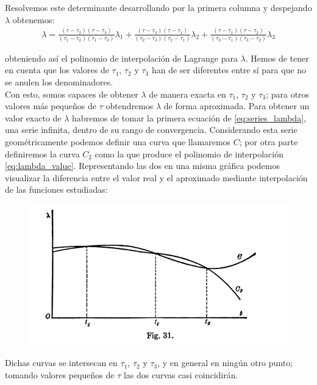\documentclass[11pt]{article}
\begin{document}
Resolvemos este determinante desarrollando por la primera columna y despejando $\lambda$ obtenemos:
\begin{align}
\lambda=
\frac{(\tau-\tau_2)(\tau-\tau_3)}{(\tau_1-\tau_2)(\tau_1-\tau_3)}\lambda_1
+\frac{(\tau-\tau_3)(\tau-\tau_1)}{(\tau_2-\tau_3)(\tau_2-\tau_1)}\lambda_2
+\frac{(\tau-\tau_1)(\tau-\tau_2)}{(\tau_3-\tau_1)(\tau_3-\tau_2)}\lambda_3
\label{eq:lambda_value}
\end{align}

\noindent obteniendo así el polinomio de interpolación de Lagrange para $\lambda$. Hemos de tener en cuenta que los valores de $\tau_1$, $\tau_2$ y $\tau_3$ han de ser diferentes entre sí para que no se anulen los denominadores.\\

Con esto, somos capaces de obtener $\lambda$ de manera exacta en $\tau_1$, $\tau_2$ y $\tau_3$; para otros valores más pequeños de $\tau$ obtendremos $\lambda$ de forma aproximada. Para obtener un valor exacto de $\lambda$ habremos de tomar la primera ecuación de \eqref{eq:series_lambda}, una serie infinita, dentro de su rango de convergencia. Considerando esta serie geométricamente podemos definir una curva que llamaremos $C$; por otra parte definiremos la curva $C_2$ como la que produce el polinomio de interpolación \eqref{eq:lambda_value}. Representando las dos en una misma gráfica podemos visualizar la diferencia entre el valor real y el aproximado mediante interpolación de las funciones estudiadas:
\begin{figure}[H]
\centering
\includegraphics[scale=0.5]{images/fig_31.png}
\end{figure}

Dichas curvas se intersecan en $\tau_1$, $\tau_2$ y $\tau_3$, y en general en ningún otro punto; tomando valores pequeños de $\tau$ las dos curvas casi coincidirán.\\
\end{document}
